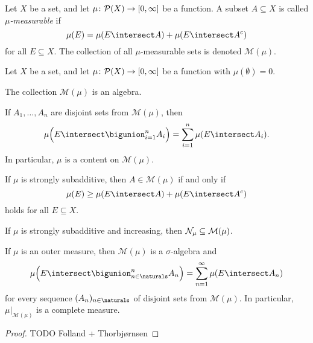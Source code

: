 \documentclass[article, a4paper, 11pt, oneside]{memoir}
\numberwithin{equation}{chapter}
\newcommand{\calM}{\mathcal{M}}
\begin{document}
\begin{definition}
    Let $X$ be a set, and let $\mu \colon \mathcal{P}(X) \to [0,\infty]$ be a function. A subset $A \subseteq X$ is called \emph{$\mu$-measurable} if
    \begin{equation*}
        \mu(E)
            = \mu(E \intersect A) + \mu(E \intersect A^c)
    \end{equation*}
    for all $E \subseteq X$. The collection of all $\mu$-measurable sets is denoted $\calM(\mu)$.
\end{definition}

\begin{theorem}[Carathéodory]
    Let $X$ be a set, and let $\mu \colon \mathcal{P}(X) \to [0,\infty]$ be a function with $\mu(\emptyset) = 0$.
    \begin{enumthm}
        \item The collection $\calM(\mu)$ is an algebra.
        
        \item If $A_1, \ldots, A_n$ are disjoint sets from $\calM(\mu)$, then
        \begin{equation*}
            \mu \Bigl( E \intersect \bigunion_{i=1}^n A_i \Bigr)
                = \sum_{i=1}^n \mu(E \intersect A_i).
        \end{equation*}
        In particular, $\mu$ is a content on $\calM(\mu)$.

        \item If $\mu$ is strongly subadditive, then $A \in \calM(\mu)$ if and only if
        \begin{equation*}
            \mu(E)
                \geq \mu(E \intersect A) + \mu(E \intersect A^c)
        \end{equation*}
        holds for all $E \subseteq X$.

        \item If $\mu$ is strongly subadditive and increasing, then $\calN_\mu \subseteq \calM(\mu)$.

        \item If $\mu$ is an outer measure, then $\calM(\mu)$ is a $\sigma$-algebra and
        \begin{equation*}
            \mu \Bigl( E \intersect \bigunion_{n \in \naturals}^n A_n \Bigr)
                = \sum_{n=1}^\infty \mu(E \intersect A_n)
        \end{equation*}
        for every sequence $(A_n)_{n \in \naturals}$ of disjoint sets from $\calM(\mu)$. In particular, $\mu|_{\calM(\mu)}$ is a complete measure.
    \end{enumthm}
\end{theorem}

\begin{proof}
    TODO Folland + Thorbjørnsen
\end{proof}



\nocite{*}

\printbibliography
\end{document}

